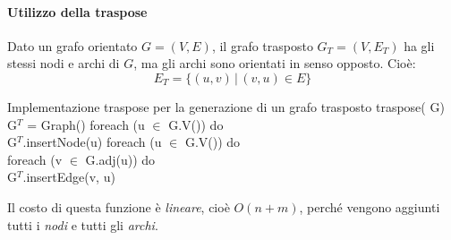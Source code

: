 \paragraph{Utilizzo della traspose}
\begin{definition}
    Dato un grafo orientato $G=(V,E)$, il grafo trasposto $G_T=(V,E_T)$ ha gli
    stessi nodi e archi di $G$, ma gli archi sono orientati in senso opposto.
    Cioè:
    \[E_T=\{(u,v)\,|\,(v,u)\in E\}\]
\end{definition}
\begin{minicode}{Implementazione traspose per la generazione di un grafo trasposto}
\ind{} traspose( G)\\
     G$^T$ = Graph()\hfill{}
    \indf foreach (u $\in$ G.V()) do\\
        G$^T$.insertNode(u)\hfill{}
    \indf foreach (u $\in$ G.V()) do\\
        \indff foreach (v $\in$ G.adj(u)) do\\
            G$^T$.insertEdge(v, u)\hfill{}
\end{minicode}\noindent
Il costo di questa funzione è \emph{lineare}, cioè $O(n+m)$, perché vengono
aggiunti tutti i \emph{nodi} e tutti gli \emph{archi}.

